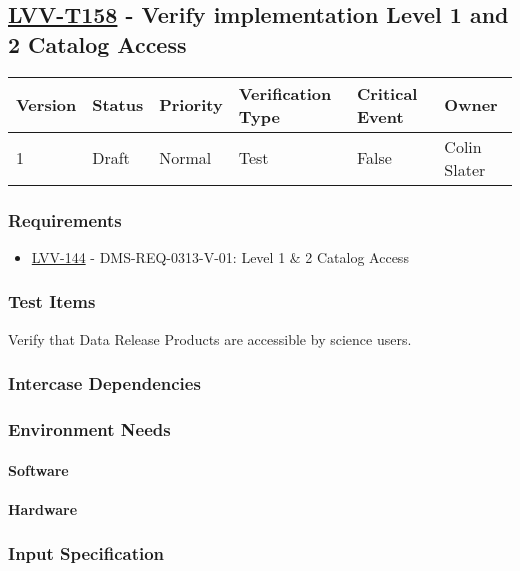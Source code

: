 \subsection{\href{https://jira.lsstcorp.org/secure/Tests.jspa\#/testCase/LVV-T158}{LVV-T158}
    - Verify implementation Level 1 and 2 Catalog Access}\label{lvv-t158}

\begin{longtable}[]{llllll}
\toprule
Version & Status & Priority & Verification Type & Critical Event & Owner
\\\midrule
1 & Draft & Normal &
Test & False & Colin Slater
\\\bottomrule
\end{longtable}

\subsubsection{Requirements}
\begin{itemize}
\item \href{https://jira.lsstcorp.org/browse/LVV-144}{LVV-144} - DMS-REQ-0313-V-01: Level 1 \& 2 Catalog Access
\end{itemize}

\subsubsection{Test Items}
Verify that Data Release Products are accessible by science users.



\subsubsection{Intercase Dependencies}

\subsubsection{Environment Needs}

\paragraph{Software}

\paragraph{Hardware}

\subsubsection{Input Specification}

